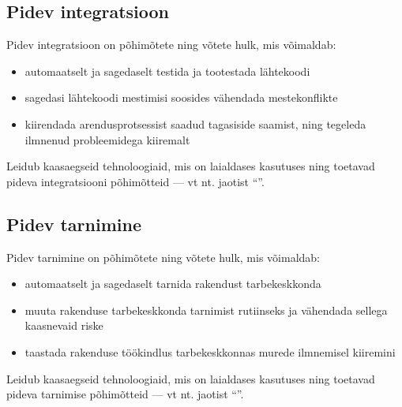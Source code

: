 \subsection{Pidev integratsioon}\label{subsec:ci}
Pidev integratsioon on põhimõtete ning võtete hulk, mis võimaldab:

\begin{itemize}
  \item automaatselt ja sagedaselt testida ja tootestada lähtekoodi \cite{gitlab-what-are-pipelines}
  \item sagedasi lähtekoodi mestimisi soosides vähendada mestekonflikte \cite{gitlab-what-is-ci}
  \item kiirendada arendusprotsessist saadud tagasiside saamist, ning tegeleda ilmnenud probleemidega kiiremalt \cite{gitlab-what-is-ci}
\end{itemize}

Leidub kaasaegseid tehnoloogiaid, mis on laialdases kasutuses \cite{github-features-actions} ning toetavad pideva integratsiooni põhimõtteid — vt nt. jaotist ``''.

\subsection{Pidev tarnimine}\label{subsec:cd}
Pidev tarnimine on põhimõtete ning võtete hulk, mis võimaldab:

\begin{itemize}
  \item automaatselt ja sagedaselt tarnida rakendust tarbekeskkonda \cite{gitlab-what-is-cd}
  \item muuta rakenduse tarbekeskkonda tarnimist rutiinseks ja vähendada sellega kaasnevaid riske \cite{gitlab-cicd-fundamentals}
  \item taastada rakenduse töökindlus tarbekeskkonnas murede ilmnemisel kiiremini \cite{gitlab-benefits-of-cicd}
\end{itemize}

Leidub kaasaegseid tehnoloogiaid, mis on laialdases kasutuses \cite{github-features-actions} ning toetavad pideva tarnimise põhimõtteid — vt nt. jaotist “”.

